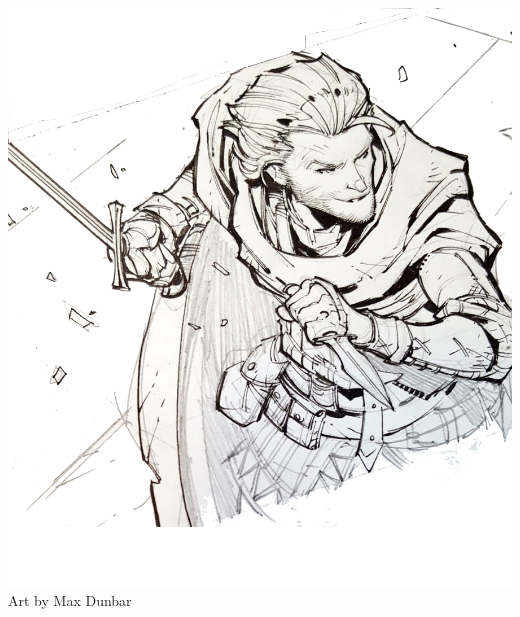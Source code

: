 \begin{multicols*}{2}
\begin{Figure}
\centering
\includegraphics[width=\textwidth]{img/trickster.png}
{\scriptsize Art by Max Dunbar}
\end{Figure}
    
\end{multicols*}

\clearpage






    

